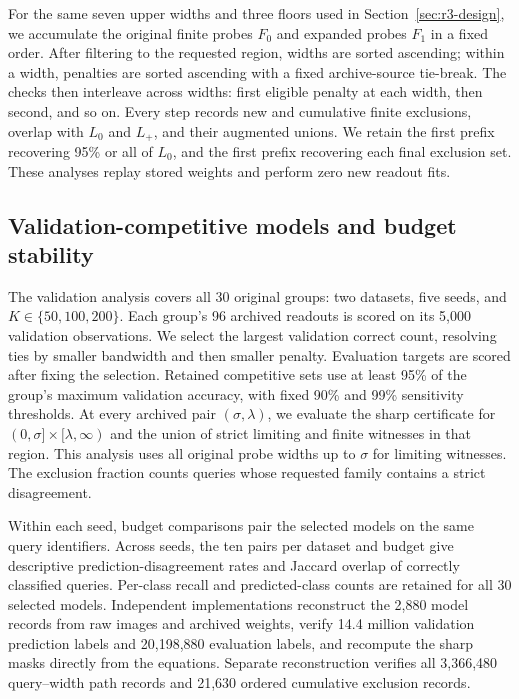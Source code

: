 For the same seven upper widths and three floors used in Section~\ref{sec:r3-design}, we accumulate the original finite probes $F_0$ and expanded probes $F_1$ in a fixed order. After filtering to the requested region, widths are sorted ascending; within a width, penalties are sorted ascending with a fixed archive-source tie-break. The checks then interleave across widths: first eligible penalty at each width, then second, and so on. Every step records new and cumulative finite exclusions, overlap with $L_0$ and $L_+$, and their augmented unions. We retain the first prefix recovering 95\% or all of $L_0$, and the first prefix recovering each final exclusion set. These analyses replay stored weights and perform zero new readout fits.

\subsection{Validation-competitive models and budget stability}
\label{sec:r4-competitive-design}
The validation analysis covers all 30 original groups: two datasets, five seeds, and $K\in\{50,100,200\}$. Each group's 96 archived readouts is scored on its 5,000 validation observations. We select the largest validation correct count, resolving ties by smaller bandwidth and then smaller penalty. Evaluation targets are scored after fixing the selection. Retained competitive sets use at least 95\% of the group's maximum validation accuracy, with fixed 90\% and 99\% sensitivity thresholds. At every archived pair $(\sigma,\lambda)$, we evaluate the sharp certificate for $(0,\sigma]\times[\lambda,\infty)$ and the union of strict limiting and finite witnesses in that region. This analysis uses all original probe widths up to $\sigma$ for limiting witnesses. The exclusion fraction counts queries whose requested family contains a strict disagreement.

Within each seed, budget comparisons pair the selected models on the same query identifiers. Across seeds, the ten pairs per dataset and budget give descriptive prediction-disagreement rates and Jaccard overlap of correctly classified queries. Per-class recall and predicted-class counts are retained for all 30 selected models. Independent implementations reconstruct the 2,880 model records from raw images and archived weights, verify 14.4 million validation prediction labels and 20,198,880 evaluation labels, and recompute the sharp masks directly from the equations. Separate reconstruction verifies all 3,366,480 query--width path records and 21,630 ordered cumulative exclusion records.
